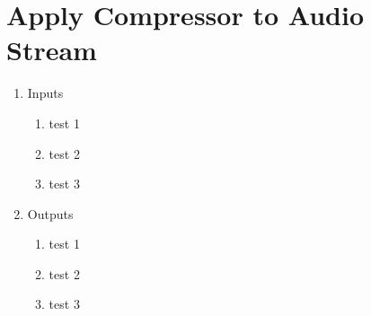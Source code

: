\section{Apply Compressor to Audio Stream}

\begin{enumerate}
	\item Inputs
	\begin{enumerate}
		\item test 1
		\item test 2
		\item test 3
	\end{enumerate}


	\item Outputs
	\begin{enumerate}
		\item test 1
		\item test 2
		\item test 3
	\end{enumerate}	


\end{enumerate}